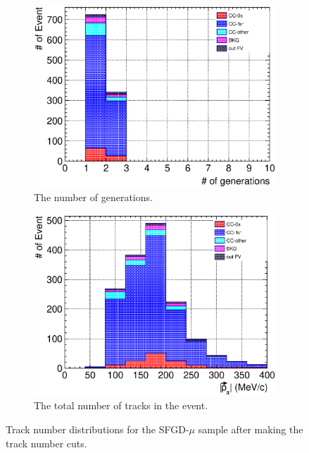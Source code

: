 \begin{figure}
\begin{subfigure}{\dbfigwid\textwidth}
       \includegraphics[width=\textwidth]{figures/sel/SFGmu_ngen_stack_al9.eps}
       \caption{The number of generations.}
       \label{subfig:tlpi-trknum-gen-sfgmu-cut}
  \end{subfigure}
  \begin{subfigure}{\dbfigwid\textwidth}
       \includegraphics[width=\textwidth]{figures/sel/SFGmu_p_pi_stack_al9.eps}
       \caption{The total number of tracks in the event.}
       \label{subfig:tlpi-trknum-ppi-sfgmu-cut}
  \end{subfigure}
  \caption{Track number distributions for the SFGD-$\mu$ sample after making the track number cuts.}
  \label{fig:tlpi-trknum-sfgmu-cut}
\end{figure}
